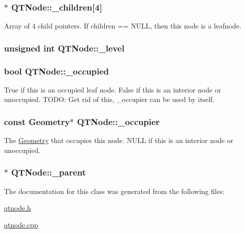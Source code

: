 \hypertarget{class_q_t_node_ab908d2ab924e7e53f2a1d0d8373833d2}{
\subsubsection[{\+\_\+children}]{$\ast$ Q\+T\+Node\+::\+\_\+children\mbox{[}4\mbox{]}}}\label{class_q_t_node_ab908d2ab924e7e53f2a1d0d8373833d2}
Array of 4 child pointers. If children == N\+U\+L\+L, then this node is a leafnode. \hypertarget{class_q_t_node_a80d41a086f3020f670732d0c7971afb0}{
\subsubsection[{\+\_\+level}]{\setlength{\rightskip}{0pt plus 5cm}unsigned int Q\+T\+Node\+::\+\_\+level}}\label{class_q_t_node_a80d41a086f3020f670732d0c7971afb0}
\hypertarget{class_q_t_node_ae8721982666788f10f11d4545a77bf61}{
\subsubsection[{\+\_\+occupied}]{\setlength{\rightskip}{0pt plus 5cm}bool Q\+T\+Node\+::\+\_\+occupied}}\label{class_q_t_node_ae8721982666788f10f11d4545a77bf61}
True if this is an occupied leaf node. False if this is an interior node or unoccupied. T\+O\+D\+O\+: Get rid of this, \+\_\+occupier can be used by itself. \hypertarget{class_q_t_node_aa61ac86e1264835162e6101d70b7883e}{
\subsubsection[{\+\_\+occupier}]{\setlength{\rightskip}{0pt plus 5cm}const {\bf Geometry}$\ast$ Q\+T\+Node\+::\+\_\+occupier}}\label{class_q_t_node_aa61ac86e1264835162e6101d70b7883e}
The \hyperlink{class_geometry}{Geometry} that occupies this node. N\+U\+L\+L if this is an interior node or unoccupied. \hypertarget{class_q_t_node_a47f01353c3e4f66ab1006a7dbc2be797}{
\subsubsection[{\+\_\+parent}]{$\ast$ Q\+T\+Node\+::\+\_\+parent}}\label{class_q_t_node_a47f01353c3e4f66ab1006a7dbc2be797}


The documentation for this class was generated from the following files\+:\begin{DoxyCompactItemize}
\item 
\hyperlink{qtnode_8h}{qtnode.\+h}\item 
\hyperlink{qtnode_8cpp}{qtnode.\+cpp}\end{DoxyCompactItemize}
